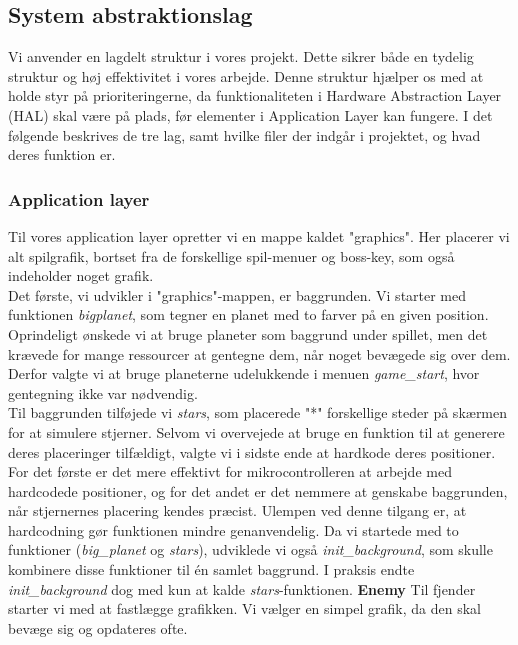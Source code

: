 \subsection{System abstraktionslag}
Vi anvender en lagdelt struktur i vores projekt. Dette sikrer både en tydelig struktur og høj effektivitet i vores arbejde. Denne struktur hjælper os med at holde styr på prioriteringerne, da funktionaliteten i Hardware Abstraction Layer (HAL) skal være på plads, før elementer i Application Layer kan fungere. I det følgende beskrives de tre lag, samt hvilke filer der indgår i projektet, og hvad deres funktion er.

\subsubsection{Application layer}
Til vores application layer opretter vi en mappe kaldet "graphics". Her placerer vi alt spilgrafik, bortset fra de forskellige spil-menuer og boss-key, som også indeholder noget grafik.\\
Det første, vi udvikler i "graphics"-mappen, er baggrunden. Vi starter med funktionen \textit{bigplanet}, som tegner en planet med to farver på en given position. Oprindeligt ønskede vi at bruge planeter som baggrund under spillet, men det krævede for mange ressourcer at gentegne dem, når noget bevægede sig over dem. Derfor valgte vi at bruge planeterne udelukkende i menuen \textit{game\_start}, hvor gentegning ikke var nødvendig.\\
Til baggrunden tilføjede vi \textit{stars}, som placerede "*" forskellige steder på skærmen for at simulere stjerner. Selvom vi overvejede at bruge en funktion til at generere deres placeringer tilfældigt, valgte vi i sidste ende at hardkode deres positioner. For det første er det mere effektivt for mikrocontrolleren at arbejde med hardcodede positioner, og for det andet er det nemmere at genskabe baggrunden, når stjernernes placering kendes præcist. Ulempen ved denne tilgang er, at hardcodning gør funktionen mindre genanvendelig.
Da vi startede med to funktioner (\textit{big\_planet} og \textit{stars}), udviklede vi også \textit{init\_background}, som skulle kombinere disse funktioner til én samlet baggrund. I praksis endte \textit{init\_background} dog med kun at kalde \textit{stars}-funktionen.
\newline
\textbf{Enemy}
\newline
Til fjender starter vi med at fastlægge grafikken. Vi vælger en simpel grafik, da den skal bevæge sig og opdateres ofte.

